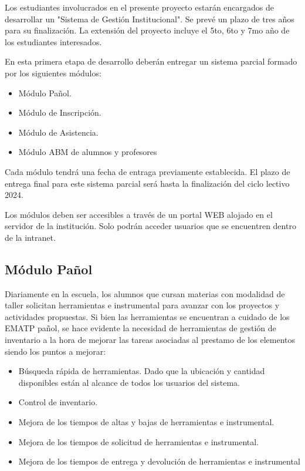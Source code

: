 Los estudiantes involucrados en el presente proyecto estarán encargados de desarrollar un "Sistema de Gestión Institucional". Se prevé un plazo de tres años para su finalización. La extensión del proyecto incluye el 5to, 6to y 7mo año de los estudiantes interesados.

En esta primera etapa de desarrollo deberán entregar un sistema parcial formado por los siguientes módulos:

\begin{itemize}
    \item Módulo Pañol.
    \item Módulo de Inscripción.
    \item Módulo de Asistencia.
    \item Módulo ABM de alumnos y profesores
\end{itemize}

Cada módulo tendrá una fecha de entraga previamente establecida. El plazo de entrega final para este sistema parcial será hasta la finalización del ciclo lectivo 2024.

Los módulos deben ser accesibles a través de un portal WEB alojado en el servidor de la institución. Solo podrán acceder usuarios que se encuentren dentro de la intranet.

\subsection{Módulo Pañol}

Diariamente en la escuela, los alumnos que cursan materias con modalidad de taller solicitan herramientas e instrumental para avanzar con los proyectos y actividades propuestas. Si bien las herramientas se encuentran a cuidado de los EMATP pañol, se hace evidente la necesidad de herramientas de gestión de inventario a la hora de mejorar las tareas asociadas al prestamo de los elementos siendo los puntos a mejorar:

\begin{itemize}
    \item Búsqueda rápida de herramientas. Dado que la ubicación y cantidad disponibles están al alcance de todos los usuarios del sistema.
    \item Control de inventario.
    \item Mejora de los tiempos de altas y bajas de herramientas e instrumental.
    \item Mejora de los tiempos de solicitud de herramientas e instrumental.
    \item Mejora de los tiempos de entrega y devolución de herramientas e instrumental
\end{itemize}

